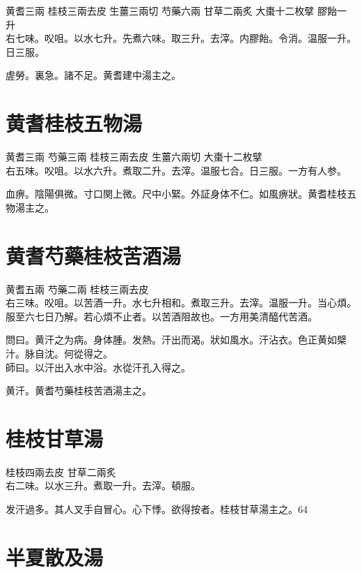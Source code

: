 黄耆{\scriptsize 三兩} 桂枝{\scriptsize 三兩去皮} 生薑{\scriptsize 三兩切} 芍藥{\scriptsize 六兩} 甘草{\scriptsize 二兩炙} 大棗{\scriptsize 十二枚擘} 膠飴{\scriptsize 一升}\\
右七味。㕮咀。以水七升。先煮六味。取三升。去滓。内膠飴。令消。温服一升。日三服。

虗勞。裏急。諸不足。黄耆建中湯主之。

\section{黄耆桂枝五物湯}

黄耆{\scriptsize 三兩} 芍藥{\scriptsize 三兩} 桂枝{\scriptsize 三兩去皮} 生薑{\scriptsize 六兩切} 大棗{\scriptsize 十二枚擘}\\
右五味。㕮咀。以水六升。煮取二升。去滓。温服七合。日三服。{\scriptsize 一方有人参。}

血痹。陰陽俱微。寸口関上微。尺中小緊。外証身体不仁。如風痹狀。黄耆桂枝五物湯主之。

\section{黄耆芍藥桂枝苦酒湯}

黄耆{\scriptsize 五兩} 芍藥{\scriptsize 二兩} 桂枝{\scriptsize 三兩去皮}\\
右三味。㕮咀。以苦酒一升。水七升相和。煮取三升。去滓。温服一升。当心煩。服至六七日乃解。若心煩不止者。以苦酒阻故也。{\scriptsize 一方用美清醯代苦酒。}

問曰。黄汗之为病。身体腫。发熱。汗出而渴。狀如風水。汗沾衣。色正黄如檗汁。脉自沈。何從得之。\\
師曰。以汗出入水中浴。水從汗孔入得之。

黄汗。黄耆芍藥桂枝苦酒湯主之。

\section{桂枝甘草湯}

桂枝{\scriptsize 四兩去皮} 甘草{\scriptsize 二兩炙}\\
右二味。以水三升。煮取一升。去滓。頓服。

发汗過多。其人叉手自冒心。心下悸。欲得按者。桂枝甘草湯主之。64

\section{半夏散及湯}

